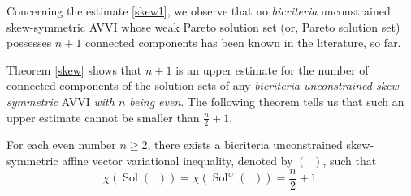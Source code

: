 \documentclass[smallextended,envcountsect]{svjour3}       %
\DeclareMathOperator{\Sol}{Sol}
\DeclareMathOperator{\Pone}{P_0}
\begin{document}
\begin{remark} Concerning the estimate \eqref{skew1}, we observe that
no \textit{bicriteria} unconstrained skew-symmetric AVVI whose weak Pareto solution set (or, Pareto solution set) possesses $n+1$ connected components has been known in the literature, so far. 
\end{remark}

Theorem \ref{skew} shows that $n+1$ is an upper estimate for the number of connected components of the solution sets of any \textit{bicriteria unconstrained skew-symmetric} AVVI \textit{with $n$ being even}. The following theorem tells us that such an upper estimate cannot be smaller than $\frac{n}{2}+1$.


\begin{theorem}\label{even} For each even number $n\geq 2$, there exists a bicriteria unconstrained skew-symmetric affine vector variational inequality, denoted by $(\Pone)$, such that
	$$\chi(\Sol(\Pone))= \chi(\Sol^w(\Pone))= \frac{n}{2}+1.$$
\end{theorem}
\end{document}
